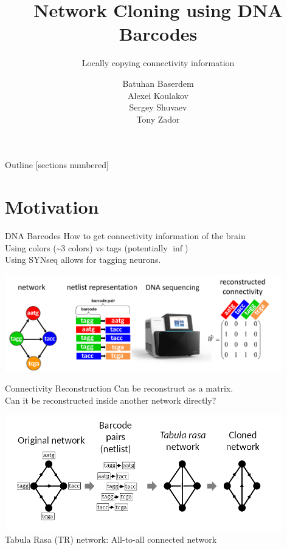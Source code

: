 \documentclass[10pt]{beamer}
\title{Network Cloning using DNA Barcodes}
\subtitle{Locally copying connectivity information}
\author{Batuhan Baserdem \\ Alexei Koulakov \\ Sergey Shuvaev \\ Tony Zador}
\institute{Cold Spring Harbor Laboratory}
\begin{document}
\maketitle

\begin{frame}{Outline}
  [sections numbered]
  \tableofcontents
\end{frame}

\section{Motivation}

\begin{frame}[fragile]{DNA Barcodes}
    How to get connectivity information of the brain \\
    Using colors (\textasciitilde 3 colors) vs tags (potentially $\inf$)\\
    Using SYNseq \cite{synseq} allows for tagging neurons.
    \begin{center}
        \includegraphics[width=0.9\textwidth]{png/synseq.png}
    \end{center}
\end{frame}

\begin{frame}[fragile]{Connectivity Reconstruction}
    Can be reconstruct as a matrix. \\
    Can it be reconstructed inside another network directly?
    \begin{center}
        \includegraphics[width=0.9\textwidth]{png/reconst_flow.png} \\
        Tabula Rasa (TR) network: All-to-all connected network
    \end{center}
\end{frame}
\end{document}
